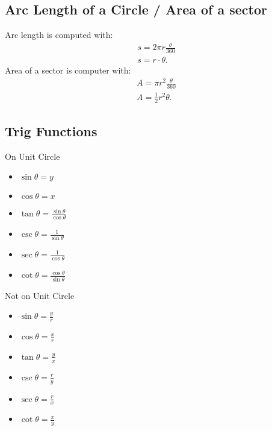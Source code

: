 \documentclass{report}
\begin{document}
        \subsection{Arc Length of a Circle / Area of a sector}
        \bigbreak \noindent 
        Arc length is computed with:
          \begin{align*}
            s = 2\pi r \frac{\theta}{360} \\
            s = r \cdot \theta
          .\end{align*}
        \bigbreak \noindent 
        Area of a sector is computer with:
        \begin{align*}
          A = \pi r^{2}\frac{\theta}{360} \\
          A = \frac{1}{2}r^{2}\theta
        .\end{align*}

        \bigbreak \noindent \bigbreak \noindent 
        \subsection{Trig Functions}
        On Unit Circle
        \begin{itemize}
          \item $\sin{\theta} = y $
          \item $\cos{\theta} = x $
          \item $\tan{\theta } = \frac{\sin{\theta }}{\cos{\theta }} $
          \item $\csc{\theta }=  \frac{1}{\sin{\theta }} $
          \item $\sec{\theta }=  \frac{1}{\cos{\theta }} $
          \item $\cot{\theta }  = \frac{\cos{\theta }}{\sin{\theta }}$
        \end{itemize}
        \bigbreak \noindent 
        Not on Unit Circle
          \begin{itemize}
            \item $\sin{\theta } = \frac{y}{r} $
            \item $\cos{\theta } = \frac{x}{r} $
            \item $\tan{\theta }  = \frac{y}{x} $
            \item $\csc{\theta }  = \frac{r}{y} $
            \item $\sec{\theta }  = \frac{r}{x} $
            \item $\cot{\theta }  = \frac{x}{y} $
          \end{itemize}
\end{document}
